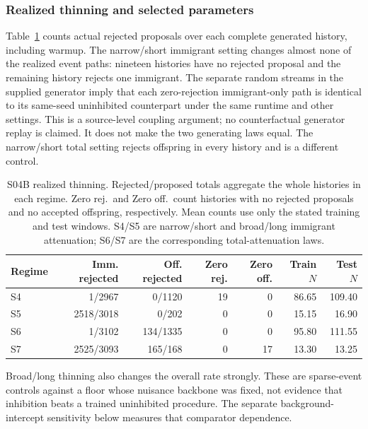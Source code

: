 \subsubsection{Realized thinning and selected parameters}
Table~\ref{tab:s04b-thinning} counts actual rejected proposals over each complete generated history, including warmup. The narrow/short immigrant setting changes almost none of the realized event paths: nineteen histories have no rejected proposal and the remaining history rejects one immigrant. The separate random streams in the supplied generator imply that each zero-rejection immigrant-only path is identical to its same-seed uninhibited counterpart under the same runtime and other settings. This is a source-level coupling argument; no counterfactual generator replay is claimed. It does not make the two generating laws equal. The narrow/short total setting rejects offspring in every history and is a different control.

\begin{table}[htbp]\centering\small
\caption{S04B realized thinning. Rejected/proposed totals aggregate the whole histories in each regime. Zero rej.\ and Zero off.\ count histories with no rejected proposals and no accepted offspring, respectively. Mean counts use only the stated training and test windows. S4/S5 are narrow/short and broad/long immigrant attenuation; S6/S7 are the corresponding total-attenuation laws.}\label{tab:s04b-thinning}
\begin{tabular}{@{}lrrrrrr@{}}\toprule
Regime & Imm. rejected & Off. rejected & Zero rej. & Zero off. & Train $N$ & Test $N$\\\midrule
S4 & 1/2967 & 0/1120 & 19 & 0 & 86.65 & 109.40\\
S5 & 2518/3018 & 0/202 & 0 & 0 & 15.15 & 16.90\\
S6 & 1/3102 & 134/1335 & 0 & 0 & 95.80 & 111.55\\
S7 & 2525/3093 & 165/168 & 0 & 17 & 13.30 & 13.25\\
\bottomrule\end{tabular}\end{table}

Broad/long thinning also changes the overall rate strongly. These are sparse-event controls against a floor whose nuisance backbone was fixed, not evidence that inhibition beats a trained uninhibited procedure. The separate background-intercept sensitivity below measures that comparator dependence.

